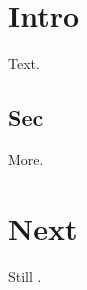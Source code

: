\documentclass{article}
\begin{document}
\chapter{Intro}
Text.
\section{Sec}
More.
\chapter{Next}
\makeatletter
Still .
\makeatother
\end{document}
